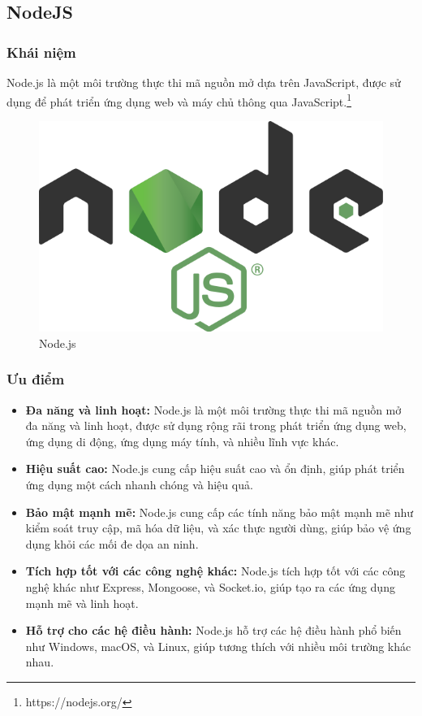 \subsection{NodeJS}
\subsubsection{Khái niệm}
\noindent Node.js là một môi trường thực thi mã nguồn mở dựa trên JavaScript, được sử dụng để phát triển ứng dụng web và máy chủ thông qua JavaScript.\footnote{https://nodejs.org/}
\begin{figure}[H]
  \begin{center}
    \includegraphics[scale=0.3]{images/hieu/phuluc/nodejs.png}
    \caption{Node.js}
  \end{center}
\end{figure}
\subsubsection{Ưu điểm}
\begin{itemize}
  \item \textbf{Đa năng và linh hoạt:} Node.js là một môi trường thực thi mã nguồn mở đa năng và linh hoạt, được sử dụng rộng rãi trong phát triển ứng dụng web, ứng dụng di động, ứng dụng máy tính, và nhiều lĩnh vực khác.
  \item \textbf{Hiệu suất cao:} Node.js cung cấp hiệu suất cao và ổn định, giúp phát triển ứng dụng một cách nhanh chóng và hiệu quả.
  \item \textbf{Bảo mật mạnh mẽ:} Node.js cung cấp các tính năng bảo mật mạnh mẽ như kiểm soát truy cập, mã hóa dữ liệu, và xác thực người dùng, giúp bảo vệ ứng dụng khỏi các mối đe dọa an ninh.
  \item \textbf{Tích hợp tốt với các công nghệ khác:} Node.js tích hợp tốt với các công nghệ khác như Express, Mongoose, và Socket.io, giúp tạo ra các ứng dụng mạnh mẽ và linh hoạt.
  \item \textbf{Hỗ trợ cho các hệ điều hành:} Node.js hỗ trợ các hệ điều hành phổ biến như Windows, macOS, và Linux, giúp tương thích với nhiều môi trường khác nhau.
\end{itemize}
